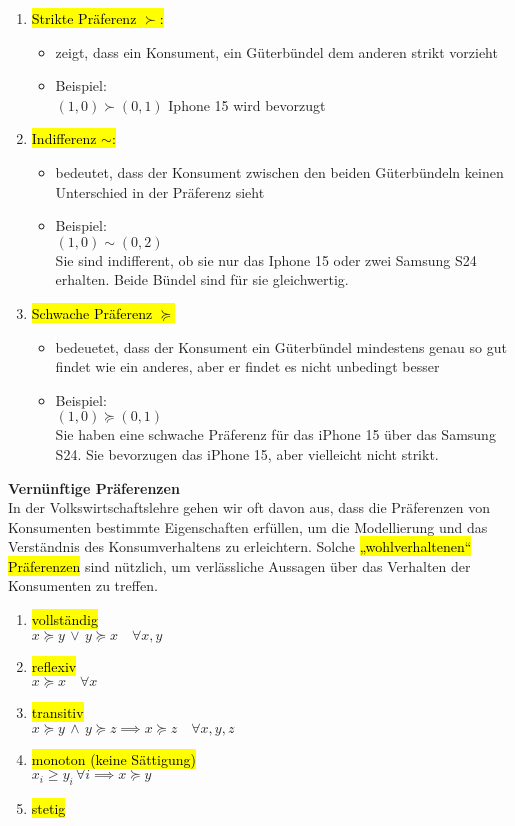 \documentclass[a4paper, 10pt]{article}
\begin{document}
\begin{enumerate}
    \item \hl{Strikte Präferenz $\succ$:} 
    \begin{itemize}
        \item zeigt, dass ein Konsument, ein Güterbündel dem anderen strikt vorzieht
        \item  Beispiel:\\
    $(1,0) \succ (0,1)$ Iphone 15 wird bevorzugt
    \end{itemize}
    
    \item \hl{Indifferenz $\sim$:}
    \begin{itemize}
        \item bedeutet, dass der Konsument zwischen den beiden Güterbündeln keinen Unterschied in der Präferenz sieht
        \item Beispiel:\\
        $(1,0) \sim (0,2)$ \\ Sie sind indifferent, ob sie nur das Iphone 15 oder zwei Samsung S24 erhalten. Beide Bündel sind für sie gleichwertig.
    \end{itemize}

    \item \hl{Schwache Präferenz $\succeq$}
    \begin{itemize}
        \item bedeuetet, dass der Konsument ein Güterbündel mindestens genau so gut findet wie ein anderes, aber er findet es nicht unbedingt besser
        \item Beispiel:\\
        $(1,0) \succeq (0,1)$\\
        Sie haben eine schwache Präferenz für das iPhone 15 über das Samsung S24. Sie bevorzugen das iPhone 15, aber vielleicht nicht strikt.
    \end{itemize}
\end{enumerate}
\noindent \textbf{Vernünftige Präferenzen}\\
In der Volkswirtschaftslehre gehen wir oft davon aus, dass die Präferenzen von Konsumenten bestimmte Eigenschaften erfüllen, um die Modellierung und das Verständnis des Konsumverhaltens zu erleichtern. Solche \hl{„wohlverhaltenen“ Präferenzen} sind nützlich, um verlässliche Aussagen über das Verhalten der Konsumenten zu treffen.
\begin{enumerate}
    \item \hl{vollständig}\\
    $x \succeq y \, \lor \, y \succeq x \quad \forall x, y$
    \item \hl{reflexiv}\\
    $x \succeq x \quad \forall x$
    \item \hl{transitiv}\\
    $x \succeq y \, \land \, y \succeq z \implies x \succeq z \quad \forall x, y, z$
    \item \hl{monoton (keine Sättigung)}\\
    $x_i \geq y_i \, \forall i \implies x \succeq y$
    \item \hl{stetig}
\end{enumerate}
\end{document}
